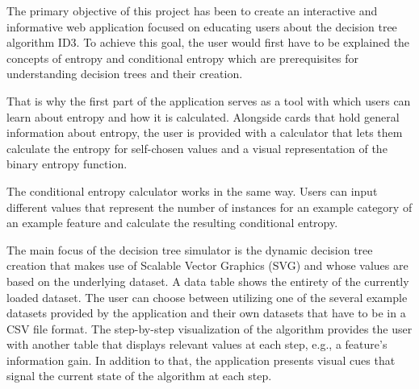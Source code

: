 
The primary objective of this project has been to create an interactive and informative web application focused on educating users about the decision tree algorithm ID3.
To achieve this goal, the user would first have to be explained the concepts of entropy and conditional entropy which are prerequisites for understanding decision trees and their creation. 

That is why the first part of the application serves as a tool with which users can learn about entropy and how it is calculated. Alongside cards that hold general information about entropy, the user is provided with a calculator that lets them calculate the entropy for self-chosen values and a visual representation of the binary entropy function.

The conditional entropy calculator works in the same way. Users can input different values that represent the number of instances for an example category of an example feature and calculate the resulting conditional entropy.

The main focus of the decision tree simulator is the dynamic decision tree creation that makes use of Scalable Vector Graphics (SVG) and whose values are based on the underlying dataset. A data table shows the entirety of the currently loaded dataset. The user can choose between utilizing one of the several example datasets provided by the application and their own datasets that have to be in a CSV file format. The step-by-step visualization of the algorithm provides the user with another table that displays relevant values at each step, e.g., a feature's information gain. In addition to that, the application presents visual cues that signal the current state of the algorithm at each step.